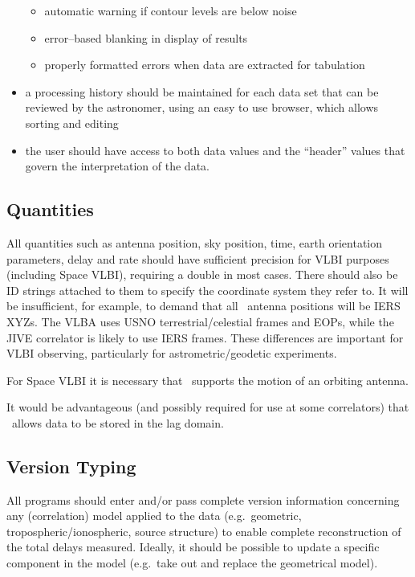 \begin{itemize}
\begin{itemize}
  \item automatic warning if contour levels are below noise

  \item error--based blanking in display of results

  \item properly formatted errors when data are extracted for tabulation

  \end{itemize}
  
\item a processing history should be maintained for each data set that
  can be reviewed by the astronomer, using an easy to use
  browser, which allows sorting and editing
    
\item the user should have access to both data values and the
    ``header'' values that govern the interpretation of the data.

\end{itemize}

\subsection{Quantities}

All quantities such as antenna position, sky position, time, earth
orientation parameters, delay and rate should have sufficient
precision for VLBI purposes (including Space VLBI), requiring a double
in most cases.  There should also be ID strings attached to them to
specify the coordinate system they refer to. It will be insufficient,
for example, to demand that all \aipspp\ antenna positions will be
IERS XYZs. The VLBA uses USNO terrestrial\slash celestial frames and EOPs,
while the JIVE correlator is likely to use IERS frames. These
differences are important for VLBI observing, particularly for
astrometric\slash geodetic experiments.

For Space VLBI it is necessary that \aipspp\ supports the motion of an
orbiting antenna.

It would be advantageous (and possibly required for use at some
correlators) that \aipspp\ allows data to be stored in the lag domain.

\subsection{Version Typing}

All programs should enter and\slash or pass complete version information
concerning any (correlation) model applied to the data (e.g.\ 
geometric, tropospheric\slash ionospheric, source structure) to enable
complete reconstruction of the total delays measured. Ideally, it
should be possible to update a specific component in the model (e.g.\ 
take out and replace the geometrical model).

